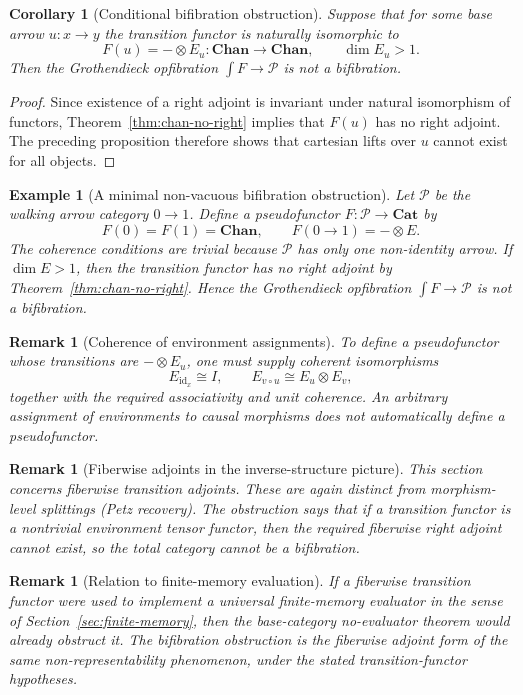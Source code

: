 \documentclass[11pt]{article}
\newtheorem{corollary}[theorem]{Corollary}
\newtheorem{remark}[theorem]{Remark}
\newtheorem{example}[theorem]{Example}
\DeclareMathOperator{\id}{id}
\begin{document}
\begin{corollary}[Conditional bifibration obstruction]
\label{cor:bifibration-obstruction}
Suppose that for some base arrow $u:x\to y$ the transition functor is
naturally isomorphic to
\[
F(u)=-\otimes E_u:\mathbf{Chan}\to\mathbf{Chan},
\qquad
\dim E_u>1.
\]
Then the Grothendieck opfibration $\int F\to\mathcal P$ is not a
bifibration.
\end{corollary}

\begin{proof}
Since existence of a right adjoint is invariant under natural isomorphism of
functors, Theorem~\ref{thm:chan-no-right} implies that $F(u)$ has no right
adjoint. The preceding proposition therefore shows that cartesian lifts over
$u$ cannot exist for all objects.
\end{proof}

\begin{example}[A minimal non-vacuous bifibration obstruction]
Let $\mathcal P$ be the walking arrow category $0\to1$. Define a
pseudofunctor $F:\mathcal P\to\mathbf{Cat}$ by
\[
F(0)=F(1)=\mathbf{Chan},
\qquad
F(0\to1)=-\otimes E.
\]
The coherence conditions are trivial because $\mathcal P$ has only one
non-identity arrow. If $\dim E>1$, then the transition functor has no right
adjoint by Theorem~\ref{thm:chan-no-right}. Hence the Grothendieck
opfibration $\int F\to\mathcal P$ is not a bifibration.
\end{example}

\begin{remark}[Coherence of environment assignments]
To define a pseudofunctor whose transitions are $-\otimes E_u$, one must
supply coherent isomorphisms
\[
E_{\id_x}\cong I,
\qquad
E_{v\circ u}\cong E_u\otimes E_v,
\]
together with the required associativity and unit coherence. An arbitrary
assignment of environments to causal morphisms does not automatically define
a pseudofunctor.
\end{remark}

\begin{remark}[Fiberwise adjoints in the inverse-structure picture]
This section concerns fiberwise transition adjoints. These are again
distinct from morphism-level splittings (Petz recovery). The obstruction
says that if a transition functor is a nontrivial environment tensor
functor, then the required fiberwise right adjoint cannot exist, so the
total category cannot be a bifibration.
\end{remark}

\begin{remark}[Relation to finite-memory evaluation]
\label{rem:groth-finite-memory}
If a fiberwise transition functor were used to implement a universal
finite-memory evaluator in the sense of
Section~\ref{sec:finite-memory}, then the base-category no-evaluator theorem
would already obstruct it. The bifibration obstruction is the fiberwise
adjoint form of the same non-representability phenomenon, under the stated
transition-functor hypotheses.
\end{remark}
\end{document}
